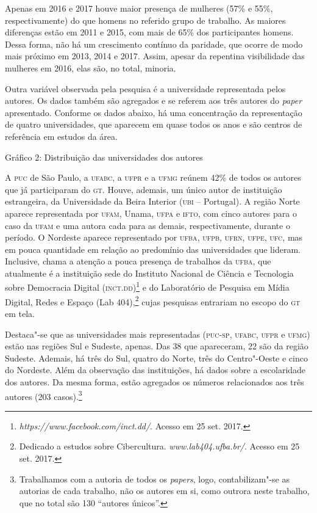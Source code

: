 Apenas em 2016 e 2017 houve maior presença de mulheres (57\% e 55\%,
respectivamente) do que homens no referido grupo de trabalho. As maiores
diferenças estão em 2011 e 2015, com mais de 65\% dos participantes
homens. Dessa forma, não há um crescimento contínuo da paridade, que
ocorre de modo mais próximo em 2013, 2014 e 2017. Assim, apesar da
repentina visibilidade das mulheres em 2016, elas são, no total,
minoria.

Outra variável observada pela pesquisa é a universidade representada
pelos autores. Os dados também são agregados e se referem aos
três autores do \emph{paper} apresentado. Conforme os dados abaixo,
há uma concentração da representação de quatro universidades, que
aparecem em quase todos os anos e são centros de referência em estudos
da área.

\begin{center}
Gráfico 2: Distribuição das universidades dos autores
\end{center}


A \textsc{puc} de São Paulo, a \textsc{ufabc}, a \textsc{ufpr} e a \textsc{ufmg} reúnem 42\% de todos os
autores que já participaram do \textsc{gt}. Houve, ademais, um único autor de
instituição estrangeira, da Universidade da Beira Interior (\textsc{ubi} --
Portugal). A região Norte aparece representada por \textsc{ufam}, Unama, \textsc{ufpa} e
\textsc{ifto}, com cinco autores para o caso da \textsc{ufam} e uma autora cada para as
demais, respectivamente, durante o período. O Nordeste aparece
representado por \textsc{ufba}, \textsc{ufpb}, \textsc{ufrn}, \textsc{ufpe}, \textsc{ufc}, mas em pouca quantidade em
relação ao predomínio das universidades que lideram. Inclusive, chama a
atenção a pouca presença de trabalhos da \textsc{ufba}, que atualmente é a
instituição sede do Instituto Nacional de Ciência e Tecnologia sobre
Democracia Digital (\textsc{inct}.\textsc{dd})\footnote{\emph{https://www.facebook.com/inct.dd/}.
  Acesso em 25 set. 2017.} e do Laboratório de Pesquisa em Mídia
Digital, Redes e Espaço (Lab 404),\footnote{Dedicado a estudos sobre
  Cibercultura. \emph{www.lab404.ufba.br/}.
  Acesso em 25 set. 2017.} cujas pesquisas entrariam no escopo do \textsc{gt} em
tela.

Destaca"-se que as universidades mais representadas (\textsc{puc}-\textsc{sp}, \textsc{ufabc}, \textsc{ufpr}
e \textsc{ufmg}) estão nas regiões Sul e Sudeste, apenas. Das 38 que apareceram,
22 são da região Sudeste. Ademais, há três do Sul, quatro do Norte, três
do Centro"-Oeste e cinco do Nordeste. Além da observação das
instituições, há dados sobre a escolaridade dos autores. Da mesma
forma, estão agregados os números relacionados aos três autores
(203 casos).\footnote{Trabalhamos com a autoria de todos os
  \emph{papers}, logo, contabilizam"-se as autorias de cada trabalho, não
  os autores em si, como outrora neste trabalho, que no total são 130
  ``autores únicos''.}


